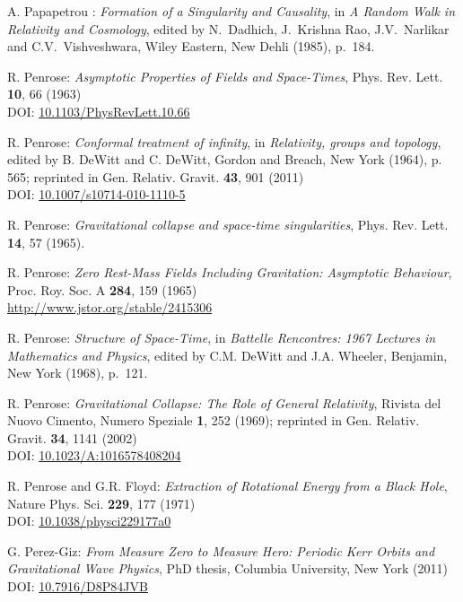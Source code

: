 \begin{thebibliography}{123}
A. Papapetrou : {\em Formation of a Singularity and Causality},
in {\em A Random Walk in Relativity and Cosmology},
edited by N.~Dadhich, J.~Krishna Rao, J.V.~Narlikar and C.V.~Vishveshwara,
Wiley Eastern, New Dehli (1985), p.~184.

R. Penrose: {\em Asymptotic Properties of Fields and Space-Times},
Phys. Rev. Lett. {\bf 10}, 66 (1963)\\
DOI: \href{https://doi.org/10.1103/PhysRevLett.10.66}{10.1103/PhysRevLett.10.66}

R. Penrose: {\em Conformal treatment of infinity}, in {\em Relativity, groups and topology},
edited by B. DeWitt and C. DeWitt,
Gordon and Breach, New York (1964), p. 565; reprinted in
Gen. Relativ. Gravit. {\bf 43}, 901 (2011)\\
DOI: \href{https://doi.org/10.1007/s10714-010-1110-5}{10.1007/s10714-010-1110-5}

R. Penrose: {\em Gravitational collapse and space-time singularities},
Phys. Rev. Lett. {\bf 14}, 57 (1965).

R. Penrose:
{\em Zero Rest-Mass Fields Including Gravitation: Asymptotic Behaviour},
Proc. Roy. Soc. A {\bf 284}, 159 (1965)\\
\url{http://www.jstor.org/stable/2415306}

R. Penrose: {\em Structure of Space-Time},
in {\em Battelle Rencontres: 1967 Lectures in Mathematics and Physics},
edited by C.M. DeWitt and J.A. Wheeler,
Benjamin, New York (1968), p.~121.

R. Penrose: {\em Gravitational Collapse: The Role of General Relativity},
Rivista del Nuovo Cimento, Numero Speziale {\bf 1}, 252 (1969); reprinted in
Gen. Relativ. Gravit. {\bf 34}, 1141 (2002)\\
DOI: \href{https://doi.org/10.1023/A:1016578408204}{10.1023/A:1016578408204}

R. Penrose and G.R. Floyd: {\em Extraction of Rotational Energy from
a Black Hole},  Nature Phys. Sci. {\bf 229}, 177 (1971)\\
DOI: \href{https://doi.org/10.1038/physci229177a0}{10.1038/physci229177a0}

G. Perez-Giz: {\em From Measure Zero to Measure Hero:
Periodic Kerr Orbits and Gravitational Wave Physics},
PhD thesis, Columbia University, New York (2011)\\
DOI: \href{https://doi.org/10.7916/D8P84JVB}{10.7916/D8P84JVB}


\end{thebibliography}
